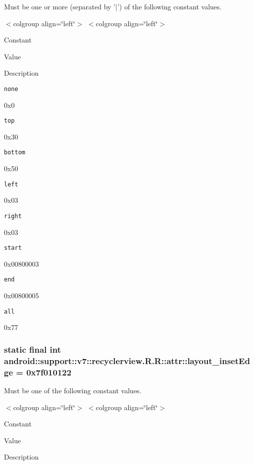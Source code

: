 Must be one or more (separated by '$|$') of the following constant values. \begin{TabularC}{0}
\hline
\end{TabularC}
$<$colgroup align=\char`\"{}left\char`\"{}$>$ $<$colgroup align=\char`\"{}left\char`\"{}$>$ 

Constant

Value

Description 

{\tt none}

0x0

{\tt top}

0x30

{\tt bottom}

0x50

{\tt left}

0x03

{\tt right}

0x03

{\tt start}

0x00800003

{\tt end}

0x00800005

{\tt all}

0x77\hypertarget{classandroid_1_1support_1_1v7_1_1recyclerview_1_1_r_1_1attr_7e20c5263d0df148ecde5c4faa3ef8f5}{
\subsubsection[{layout\_\-insetEdge}]{\setlength{\rightskip}{0pt plus 5cm}static final int android::support::v7::recyclerview.R.R::attr::layout\_\-insetEdge = 0x7f010122}}
\label{classandroid_1_1support_1_1v7_1_1recyclerview_1_1_r_1_1attr_7e20c5263d0df148ecde5c4faa3ef8f5}


Must be one of the following constant values. \begin{TabularC}{0}
\hline
\end{TabularC}
$<$colgroup align=\char`\"{}left\char`\"{}$>$ $<$colgroup align=\char`\"{}left\char`\"{}$>$ 

Constant

Value

Description 

